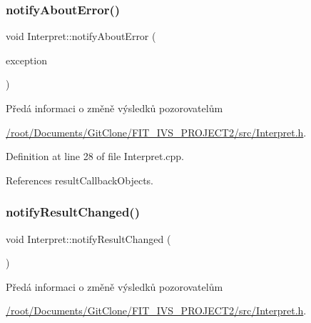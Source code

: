 \subsubsection{\texorpdfstring{notify\+About\+Error()}{notifyAboutError()}}
{\footnotesize\ttfamily void Interpret\+::notify\+About\+Error (\begin{DoxyParamCaption}\item[{\hyperlink{class_interpret_exception}{Interpret\+Exception}}]{exception }\end{DoxyParamCaption})\hspace{0.3cm}{\ttfamily [private]}}

Předá informaci o změně výsledků pozorovatelům \begin{Desc}
\item[Examples\+: ]\par
\hyperlink{_2root_2_documents_2_git_clone_2_f_i_t__i_v_s__p_r_o_j_e_c_t2_2src_2_interpret_8h-example}{/root/\+Documents/\+Git\+Clone/\+F\+I\+T\+\_\+\+I\+V\+S\+\_\+\+P\+R\+O\+J\+E\+C\+T2/src/\+Interpret.\+h}.\end{Desc}


Definition at line 28 of file Interpret.\+cpp.



References result\+Callback\+Objects.

\mbox{\label{classteam22_1_1_calc_1_1_interpret_af38e3b867c32f50c921027249fc1185a}} 
\subsubsection{\texorpdfstring{notify\+Result\+Changed()}{notifyResultChanged()}}
{\footnotesize\ttfamily void Interpret\+::notify\+Result\+Changed (\begin{DoxyParamCaption}{ }\end{DoxyParamCaption})\hspace{0.3cm}{\ttfamily [private]}}

Předá informaci o změně výsledků pozorovatelům \begin{Desc}
\item[Examples\+: ]\par
\hyperlink{_2root_2_documents_2_git_clone_2_f_i_t__i_v_s__p_r_o_j_e_c_t2_2src_2_interpret_8h-example}{/root/\+Documents/\+Git\+Clone/\+F\+I\+T\+\_\+\+I\+V\+S\+\_\+\+P\+R\+O\+J\+E\+C\+T2/src/\+Interpret.\+h}.\end{Desc}


